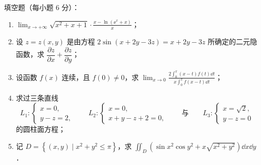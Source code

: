 
填空题（每小题 6 分）：
\begin{enumerate}[label=(\arabic*)]
  \item $\displaystyle\lim_{x\to+\infty}\sqrt{x^{2}+x+1}\cdot\frac{x-\ln(\ee^{x}+x)}{x}$；
  \item 设 $z=z(x,y)$ 是由方程 $2\sin(x+2y-3z)=x+2y-3z$ 所确定的二元隐函数，求 $\dfrac{\partial z}{\partial x}+\dfrac{\partial z}{\partial y}$；
  \item 设函数 $f(x)$ 连续，且 $f(0)\neq0$，求 $\displaystyle\lim_{x\to0}\frac{2\int_{0}^{x}(x-t)f(t)\dd t}{x\int_{0}^{x}f(x-t)\dd t}$；
  \item 求过三条直线
  \[
  L_{1}:\begin{cases}x=0,\\ y-z=2,\end{cases}\qquad
  L_{2}:\begin{cases}x=0,\\ x+y-z+2=0,\end{cases}\qquad\text{与}\qquad
  L_{3}:\begin{cases}x=\sqrt{2},\\ y-z=0\end{cases}
  \]
  的圆柱面方程；
  \item 记 $D=\left\{(x,y)\mid x^{2}+y^{2}\le\pi\right\}$，求 $\displaystyle\iint_{D}\left(\sin x^{2}\cos y^{2}+x\sqrt{x^{2}+y^{2}}\right)\dd x\dd y$．
\end{enumerate}
